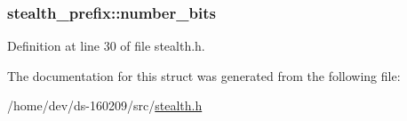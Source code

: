 \subsubsection[{number\+\_\+bits}]{ stealth\+\_\+prefix\+::number\+\_\+bits}\label{structstealth__prefix_a59f7003da36853b8b5c4872eaab0df84}


Definition at line 30 of file stealth.\+h.



The documentation for this struct was generated from the following file\+:\begin{DoxyCompactItemize}
\item 
/home/dev/ds-\/160209/src/\hyperlink{stealth_8h}{stealth.\+h}\end{DoxyCompactItemize}

